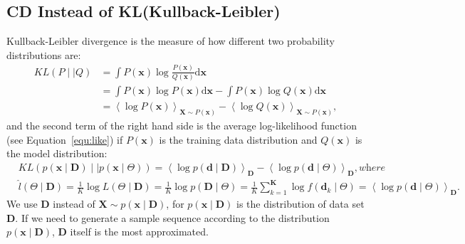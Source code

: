 \documentclass[11pt,twoside,a4paper]{article}
\def\D{\mathrm{d}}
\begin{document}
\subsection{CD Instead of KL(Kullback-Leibler)}
\label{sec:CD}
	Kullback-Leibler divergence is the measure of how different two probability distributions are:
	\begin{equation}
	\begin{aligned}
	KL(P \mid \mid Q)
	&= \int P(\mathbf{x}) \log \frac{P(\mathbf{x})}{Q(\mathbf{x})} \D \mathbf{x}\\
	&= \int P(\mathbf{x}) \log P(\mathbf{x}) \D \mathbf{x} - \int P(\mathbf{x}) \log Q(\mathbf{x}) \D \mathbf{x}\\
	&= \left \langle \log P(\mathbf{x}) \right \rangle_{\mathbf{X} \sim P(\mathbf{x})} - \left \langle \log Q(\mathbf{x}) \right \rangle_{\mathbf{X} \sim P(\mathbf{x})} ,
	\end{aligned}
	\end{equation}
	and the second term of the right hand side is the average log-likelihood function (see Equation~\ref{equ:like}) if $P(\mathbf{x})$ is the training data distribution and $Q(\mathbf{x})$ is the model distribution:
	\begin{equation}
	\begin{aligned}
	& KL \left( p(\mathbf{x} \mid \mathbf{D}) \mid \mid p(\mathbf{x} \mid \Theta) \right)
	=   \left \langle \log p(\mathbf{d} \mid \mathbf{D}) \right \rangle_{\mathbf{D}} - \left \langle \log p(\mathbf{d} \mid \Theta) \right \rangle_{\mathbf{D}}, \textit{where} \\
	& \hat{l} (\Theta \mid \mathbf{D}) =\frac{1}{K}\log  L (\Theta \mid \mathbf{D}) 
	=  \frac{1}{K}\log p(\mathbf{D} \mid \Theta ) 
	= \frac{1}{K} \sum_{k=1}^{\mathbf{K}} \log f(\mathbf{d}_k \mid \Theta )
	= \left \langle \log p(\mathbf{d} \mid \Theta) \right \rangle_{\mathbf{D}}.
	\end{aligned}
	\end{equation}
	We use $ \mathbf{D} $ instead of $ \mathbf{X} \sim p(\mathbf{x} \mid \mathbf{D}) $, for $ p(\mathbf{x} \mid \mathbf{D}) $ is the distribution of data set $ \mathbf{D} $.
	If we need to generate a sample sequence according to the distribution $ p(\mathbf{x} \mid \mathbf{D}) $, $ \mathbf{D} $ itself is the most approximated.
\end{document}
